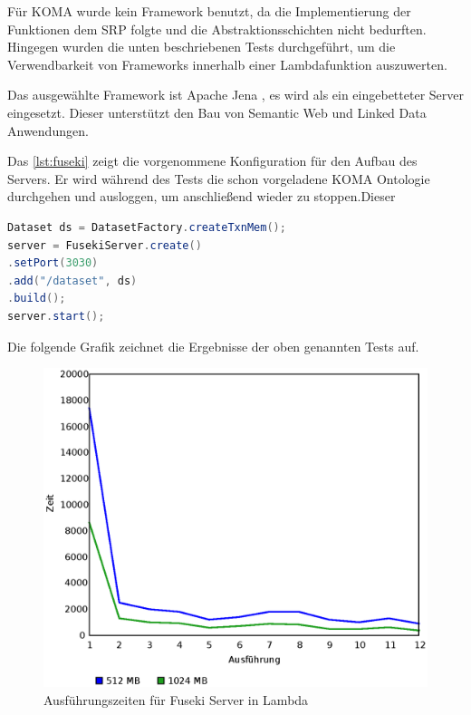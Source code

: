 \documentclass[
12pt,
english,
ngerman,
headsepline,
twoside,
openright,
numbers=noenddot,version=first
]{scrreprt}
\begin{document}
Für \acrshort{KOMA} wurde kein Framework benutzt, da die Implementierung der Funktionen dem \acrshort{SRP} folgte und die Abstraktionsschichten nicht bedurften. Hingegen wurden die unten beschriebenen Tests durchgeführt, um die Verwendbarkeit von Frameworks innerhalb einer Lambdafunktion auszuwerten. 

Das ausgewählte Framework ist Apache Jena \cite{fuseki}, es wird als ein eingebetteter Server eingesetzt. Dieser unterstützt den Bau von Semantic Web und Linked Data Anwendungen.

Das \autoref{lst:fuseki} zeigt die vorgenommene Konfiguration für den Aufbau des Servers. Er wird während des Tests die schon vorgeladene \acrshort{KOMA} Ontologie durchgehen und ausloggen, um anschließend wieder zu stoppen.Dieser

\begin{lstlisting}[language=Java,caption={Embedded Server in Lambda},label={lst:fuseki}]
Dataset ds = DatasetFactory.createTxnMem();
server = FusekiServer.create()
.setPort(3030)
.add("/dataset", ds)
.build();
server.start();

\end{lstlisting}

Die folgende Grafik zeichnet die Ergebnisse der oben genannten Tests auf. 

\begin{figure}[H]
	\centering
	\includegraphics[scale=0.60]{./pics/cold-fuseky.eps}
	\caption{Ausführungszeiten für Fuseki Server in Lambda }
\end{figure}
\end{document}
